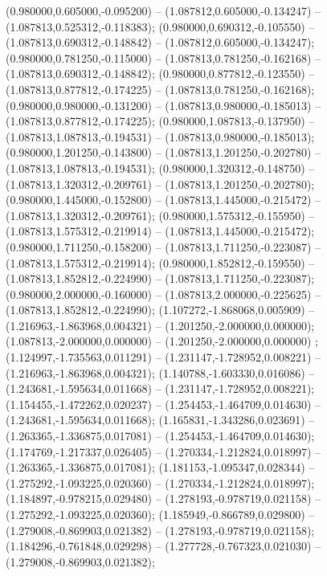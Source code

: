  (0.980000,0.605000,-0.095200) -- (1.087812,0.605000,-0.134247) -- (1.087813,0.525312,-0.118383);
 (0.980000,0.690312,-0.105550) -- (1.087813,0.690312,-0.148842) -- (1.087812,0.605000,-0.134247);
 (0.980000,0.781250,-0.115000) -- (1.087813,0.781250,-0.162168) -- (1.087813,0.690312,-0.148842);
 (0.980000,0.877812,-0.123550) -- (1.087813,0.877812,-0.174225) -- (1.087813,0.781250,-0.162168);
 (0.980000,0.980000,-0.131200) -- (1.087813,0.980000,-0.185013) -- (1.087813,0.877812,-0.174225);
 (0.980000,1.087813,-0.137950) -- (1.087813,1.087813,-0.194531) -- (1.087813,0.980000,-0.185013);
 (0.980000,1.201250,-0.143800) -- (1.087813,1.201250,-0.202780) -- (1.087813,1.087813,-0.194531);
 (0.980000,1.320312,-0.148750) -- (1.087813,1.320312,-0.209761) -- (1.087813,1.201250,-0.202780);
 (0.980000,1.445000,-0.152800) -- (1.087813,1.445000,-0.215472) -- (1.087813,1.320312,-0.209761);
 (0.980000,1.575312,-0.155950) -- (1.087813,1.575312,-0.219914) -- (1.087813,1.445000,-0.215472);
 (0.980000,1.711250,-0.158200) -- (1.087813,1.711250,-0.223087) -- (1.087813,1.575312,-0.219914);
 (0.980000,1.852812,-0.159550) -- (1.087813,1.852812,-0.224990) -- (1.087813,1.711250,-0.223087);
 (0.980000,2.000000,-0.160000) -- (1.087813,2.000000,-0.225625) -- (1.087813,1.852812,-0.224990);
 (1.107272,-1.868068,0.005909) -- (1.216963,-1.863968,0.004321) -- (1.201250,-2.000000,0.000000);
 (1.087813,-2.000000,0.000000) -- (1.201250,-2.000000,0.000000) ;
 (1.124997,-1.735563,0.011291) -- (1.231147,-1.728952,0.008221) -- (1.216963,-1.863968,0.004321);
 (1.140788,-1.603330,0.016086) -- (1.243681,-1.595634,0.011668) -- (1.231147,-1.728952,0.008221);
 (1.154455,-1.472262,0.020237) -- (1.254453,-1.464709,0.014630) -- (1.243681,-1.595634,0.011668);
 (1.165831,-1.343286,0.023691) -- (1.263365,-1.336875,0.017081) -- (1.254453,-1.464709,0.014630);
 (1.174769,-1.217337,0.026405) -- (1.270334,-1.212824,0.018997) -- (1.263365,-1.336875,0.017081);
 (1.181153,-1.095347,0.028344) -- (1.275292,-1.093225,0.020360) -- (1.270334,-1.212824,0.018997);
 (1.184897,-0.978215,0.029480) -- (1.278193,-0.978719,0.021158) -- (1.275292,-1.093225,0.020360);
 (1.185949,-0.866789,0.029800) -- (1.279008,-0.869903,0.021382) -- (1.278193,-0.978719,0.021158);
 (1.184296,-0.761848,0.029298) -- (1.277728,-0.767323,0.021030) -- (1.279008,-0.869903,0.021382);
